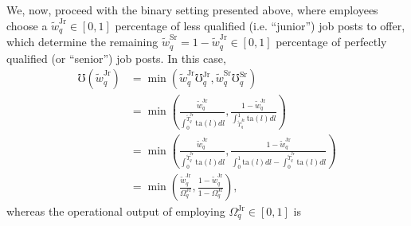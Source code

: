 \documentclass[hidelinks, nonatbib]{elsarticle}
\begin{document}
\begin{enumerate}
    We, now, proceed with the binary setting presented above, where employees choose a $\tilde{w}_{q}^{\text{Jr}} \in [0,1]$ percentage of less qualified (i.e. ``junior'') job posts to offer, which determine the remaining $\tilde{w}_{q}^{\text{Sr}} = 1 - \tilde{w}_{q}^{\text{Jr}} \in [0,1]$ percentage of perfectly qualified (or ``senior'') job posts. In this case,
    \begin{align}
        \mho(\tilde{w}_{q}^{\text{Jr}})
        &=
        \min\left(
            \tilde{w}_{q}^{\text{Jr}}
            \mho_{q}^{\text{Jr}}
            ,
            \tilde{w}_{q}^{\text{Sr}}
            \mho_{q}^{\text{Sr}}
        \right)
        \\
        &=
        \min\left(
            \frac{
                \tilde{w}_{q}^{\text{Jr}}
            }{
                \int_{0}^{
                    \tilde{T}_{q}^{\text{Jr}}
                }{
                    \text{ta}(l)
                    dl
                }
            }
            ,
            \frac{
                1 - \tilde{w}_{q}^{\text{Jr}}
            }{
                \int_{
                    \tilde{T}_{q}^{\text{Jr}}
                }^{1}{
                    \text{ta}(l)
                    dl
                }
            }
        \right)
        \\
        &=
        \min\left(
            \frac{
                \tilde{w}_{q}^{\text{Jr}}
            }{
                \int_{0}^{
                    \tilde{T}_{q}^{\text{Jr}}
                }{
                    \text{ta}(l)
                    dl
                }
            }
            ,
            \frac{
                1 - \tilde{w}_{q}^{\text{Jr}}
            }{
                \int_{0}^{1}{
                    \text{ta}(l)
                    dl
                }
                -
                \int_{0}^{
                    \tilde{T}_{q}^{\text{Jr}}
                }{
                    \text{ta}(l)
                    dl
                }
            }
        \right)
        \\
        &=
        \min\left(
            \frac{
                \tilde{w}_{q}^{\text{Jr}}
            }{
                \Omega_{q}^{\text{Jr}}
            }
            ,
            \frac{
                1 - \tilde{w}_{q}^{\text{Jr}}
            }{
                1 - \Omega_{q}^{\text{Jr}}
            }
        \right)
        ,
    \end{align}
    whereas the operational output of employing $\Omega_{q}^{\text{Jr}} \in [0,1]$ is

\end{enumerate}
\end{document}

